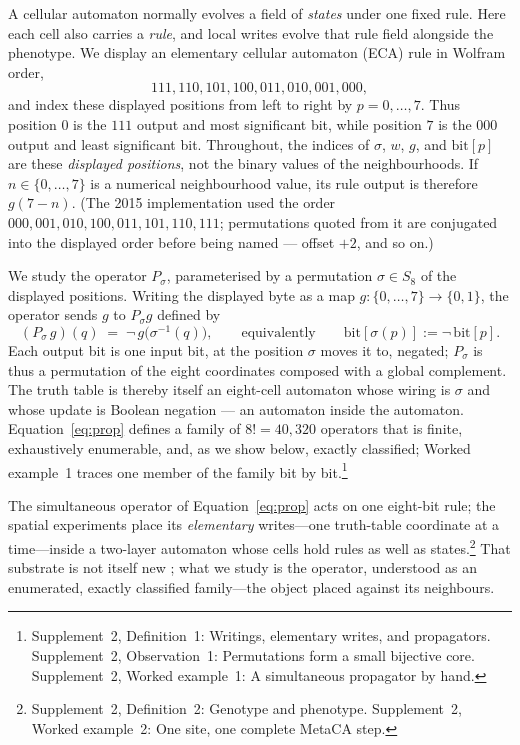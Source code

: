 \documentclass[man,12pt,floatsintext,donotrepeattitle]{apa7}
\newcommand{\sig}{\sigma}
\newcommand{\bit}[1]{\mathrm{bit}[#1]}
\newcommand{\secref}[1]{\emph{\nameref{#1}}}
\newcommand{\supptheorytext}[2]{Supplement~2, #1: #2.}
\newcommand{\suppnote}[1]{\footnote{#1}}
\begin{document}
A cellular automaton normally evolves a field of \emph{states} under one
fixed rule. Here each cell also carries a \emph{rule}, and local writes evolve
that rule field alongside the phenotype. We display an elementary cellular
automaton (ECA) rule in Wolfram order,
\[
111,110,101,100,011,010,001,000,
\]
and index these displayed positions from left to right by $p=0,\ldots,7$.
Thus position $0$ is the $111$ output and most significant bit, while position
$7$ is the $000$ output and least significant bit. Throughout, the indices of
$\sig$, $w$, $g$, and $\bit{p}$ are these \emph{displayed positions}, not the
binary values of the neighbourhoods. If $n\in\{0,\ldots,7\}$ is a numerical
neighbourhood value, its rule output is therefore $g(7-n)$. (The 2015
implementation used the order $000,001,010,100,011,101,110,111$; permutations
quoted from it are conjugated into the displayed order before being named ---
offset $+2$, and so on.)

We study the operator $P_\sig$, parameterised by a permutation
$\sig\in S_8$ of the displayed positions. Writing the displayed byte as a map
$g\colon\{0,\dots,7\}\to\{0,1\}$, the operator sends $g$ to $P_\sig g$ defined by
\begin{equation}
(P_\sig\, g)(q) \;=\; \lnot\, g\bigl(\sig^{-1}(q)\bigr),
\qquad\text{equivalently}\qquad \bit{\sig(p)} := \lnot\,\bit{p}.
\label{eq:prop}
\end{equation}
Each output bit is one input bit, at the position $\sig$ moves it to, negated;
$P_\sig$ is thus a permutation of the eight coordinates composed with a global
complement. The truth table is thereby itself an eight-cell automaton whose
wiring is $\sig$ and whose update is Boolean negation --- an automaton inside
the automaton. Equation~\eqref{eq:prop} defines a family of $8! = 40{,}320$
operators that is finite, exhaustively enumerable, and, as we show below,
exactly classified; Worked example~1 traces one member of the family bit by
bit.\suppnote{\supptheorytext{Definition~1}{Writings, elementary writes, and propagators} \supptheorytext{Observation~1}{Permutations form a small bijective core} \supptheorytext{Worked example~1}{A simultaneous propagator by hand}}

The simultaneous operator of Equation~\eqref{eq:prop} acts on one eight-bit
rule; the spatial experiments place its \emph{elementary} writes---one
truth-table coordinate at a time---inside a two-layer automaton whose cells
hold rules as well as states.\suppnote{\supptheorytext{Definition~2}{Genotype and phenotype} \supptheorytext{Worked example~2}{One site, one complete MetaCA step}}
That substrate is not itself new \parencite{corneli2015search}; what we study
is the operator, understood as an enumerated, exactly classified family---the
object \secref{sec:related} placed against its neighbours.
\end{document}
